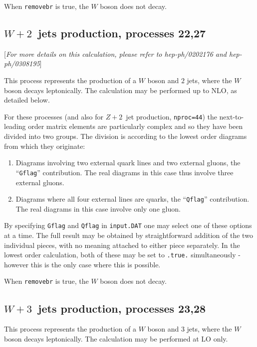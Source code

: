 \documentclass[12pt]{article}
\begin{document}
When {\tt removebr} is true, the $W$ boson does not decay.

\subsection{$W+2$~jets production, processes 22,27}
\label{subsec:w2jets}

\begin{center}
[{\it For more details on this calculation, please refer to \break
 hep-ph/0202176 and hep-ph/0308195}]
\end{center}
This process represents the production of a $W$ boson and $2$ jets,
where the $W$ boson decays leptonically. The calculation may be
performed up to NLO, as detailed below.

For these processes (and also for $Z+2$~jet production, {\tt nproc=44})
the next-to-leading order matrix elements are
particularly complex and so they have been divided into two groups.
The division is according to the lowest order diagrams from which they
originate:
\begin{enumerate}
\item Diagrams involving two external quark lines and two external gluons,
the ``{\tt Gflag}'' contribution. The real diagrams in this case thus
involve three external gluons.

\item Diagrams where all four external lines are quarks,
the ``{\tt Qflag}'' contribution. The real diagrams in this case 
involve only one gluon.
\end{enumerate}

By specifying {\tt Gflag} and {\tt Qflag} in {\tt input.DAT} one may
select one of these options at a time. The full result may be obtained
by straightforward addition of the two individual pieces, with no
meaning attached to either piece separately. In the lowest order calculation,
both of these may be set to {\tt .true.} simultaneously - however this is
the only case where this is possible.

When {\tt removebr} is true, the $W$ boson does not decay.

\subsection{$W+3$~jets production, processes 23,28}
\label{subsec:w3jets}

This process represents the production of a $W$ boson and $3$ jets,
where the $W$ boson decays leptonically. The calculation may be
performed at LO only.
\end{document}

